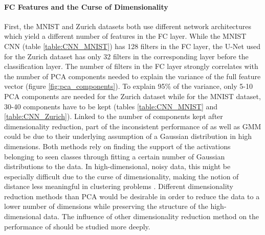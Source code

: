 \documentclass[10pt]{article}
\begin{document}
\paragraph{\gls{FC} Features and the Curse of Dimensionality}  First, the MNIST and Zurich datasets both use different network architectures which yield a different number of features in the \gls{FC} layer. While the \gls{MNIST} \gls{CNN} (table \ref{table:CNN_MNIST}) has 128 filters in the \gls{FC} layer, the U-Net used for the Zurich dataset has only 32 filters in the corresponding layer before the classification layer. The number of filters in the \gls{FC} layer strongly correlates with the number of \gls{PCA} components needed to explain the variance of the full feature vector (figure \ref{fig:pca_components}). To explain 95\% of the variance, only 5-10 \gls{PCA} components are needed for the Zurich dataset while for the \gls{MNIST} dataset, 30-40 components have to be kept (tables \ref{table:CNN_MNIST} and \ref{table:CNN_Zurich}). Linked to the number of components kept after dimensionality reduction, part of the inconsistent performance of  as well as \gls{GMM} could be due to their underlying assumption of a Gaussian distribution in high dimensions. Both methods rely on finding the support of the activations belonging to seen classes through fitting a certain number of Gaussian distributions to the data. In high-dimensional, noisy data, this might be especially difficult due to the curse of dimensionality, making the notion of distance less meaningful in clustering problems \cite{Hinneburg2000WhatIT}. Different dimensionality reduction methods than \gls{PCA} would be desirable in order to reduce the data to a lower number of dimensions while preserving the structure of the high-dimensional data. The influence of other dimensionality reduction method on the performance of  should be studied more deeply.

\end{document}
